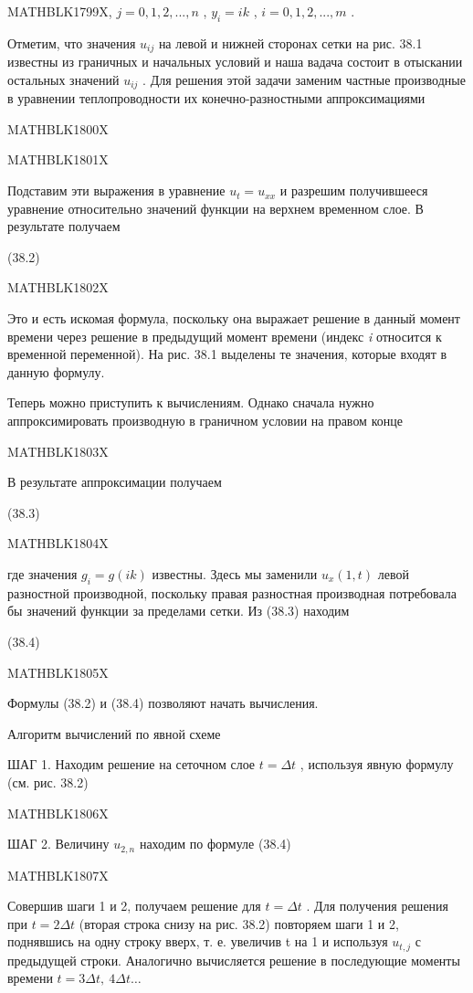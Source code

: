 \documentclass[
]{article}
\begin{document}
MATHBLK1799X, \(j = 0, 1, 2, ..., n\) , \(y_i = ik\) ,
\(i = 0, 1, 2, ..., m\) .

Отметим, что значения \(u_{ij}\) на левой и нижней сторонах сетки на
рис. 38.1 известны из граничных и начальных условий и наша вадача
состоит в отыскании остальных значений \(u_{ij}\) . Для решения этой
задачи заменим частные производные в уравнении теплопроводности их
конечно-разностными аппроксимациями

MATHBLK1800X

MATHBLK1801X

Подставим эти выражения в уравнение \(u_t = u_{xx}\) и разрешим
получившееся уравнение относительно значений функции на верхнем
временном слое. В результате получаем

(38.2)

MATHBLK1802X

Это и есть искомая формула, поскольку она выражает решение в данный
момент времени через решение в предыдущий момент времени (индекс
\emph{i} относится к временной переменной). На рис. 38.1 выделены те
значения, которые входят в данную формулу.

Теперь можно приступить к вычислениям. Однако сначала нужно
аппроксимировать производную в граничном условии на правом конце

MATHBLK1803X

В результате аппроксимации получаем

(38.3)

MATHBLK1804X

где значения \(g_i = g(ik)\) известны. Здесь мы заменили \(u_x(1, t)\)
левой разностной производной, поскольку правая разностная производная
потребовала бы значений функции за пределами сетки. Из (38.3) находим

(38.4)

MATHBLK1805X

Формулы (38.2) и (38.4) позволяют начать вычисления.

Алгоритм вычислений по явной схеме

ШАГ 1. Находим решение на сеточном слое \(t = \Delta t\) , используя
явную формулу (см. рис. 38.2)

MATHBLK1806X

ШАГ 2. Величину \(u_{2,n}\) находим по формуле (38.4)

MATHBLK1807X

Совершив шаги 1 и 2, получаем решение для \(t=\Delta t\) . Для получения
решения при \(t=2\Delta t\) (вторая строка снизу на рис. 38.2) повторяем
шаги 1 и 2, поднявшись на одну строку вверх, т. е. увеличив t на 1 и
используя \(u_{t,j}\) с предыдущей строки. Аналогично вычисляется
решение в последующие моменты времени \(t=3\Delta t,\ 4\Delta t\dots\)
\end{document}
